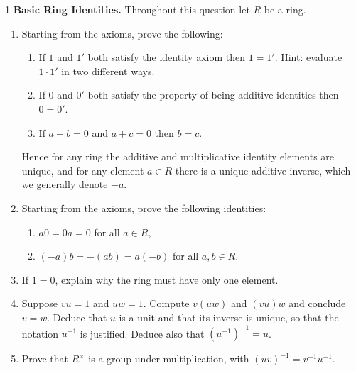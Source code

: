 \documentclass[Notebook.tex]{subfiles}
\begin{document}
\hrulefill

\begin{problem}{1}\label{r:first}
	\textbf{Basic Ring Identities.} Throughout this question let $R$ be a ring.
	\begin{enumerate}[label=(\alph*),ref=\theenumi\alph*]
		\item Starting from the axioms, prove the following:
		\begin{enumerate}[label=(\roman*),ref=\theenumi\roman*]
			\item If $1$ and $1'$ both satisfy the identity axiom then $1=1'$. Hint: evaluate $1\cdot1'$ in two different ways.
			\item If $0$ and $0'$ both satisfy the property of being additive identities then $0=0'$.
			\item If $a+b=0$ and $a+c=0$ then $b=c$.
		\end{enumerate}
		Hence for any ring the additive and multiplicative identity elements are unique, and for any element $a\in R$ there is a unique additive inverse, which we generally denote $-a$.
		\item Starting from the axioms, prove the following identities:
		\begin{enumerate}[label=(\roman*),ref=\theenumi\roman*]
			\item $a0=0a=0$ for all $a\in R$,
			\item $(-a)b=-(ab)=a(-b)$ for all $a,b\in R$.
		\end{enumerate}
		\item If $1=0$, explain why the ring must have only one element.
		\item Suppose $vu=1$ and $uw=1$. Compute $v(uw)$ and $(vu)w$ and conclude $v=w$. Deduce that $u$ is a unit and that its inverse is unique, so that the notation $u^{-1}$ is justified. Deduce also that $(u^{-1})^{-1}=u$.
		\item Prove that $R^\times$ is a group under multiplication, with $(uv)^{-1}=v^{-1}u^{-1}$.
	\end{enumerate}
\end{problem}
\end{document}
